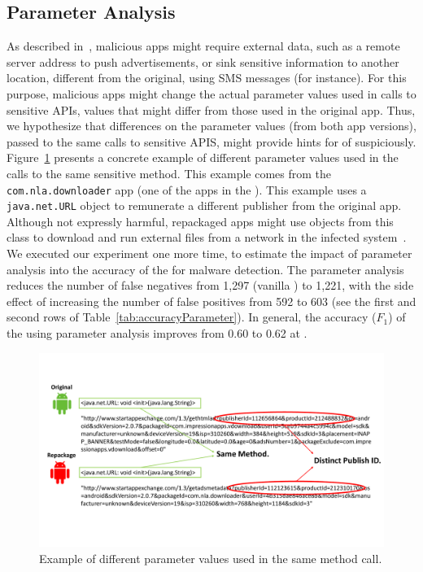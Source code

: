 \subsection{Parameter Analysis}

As described in~\cite{le2018towards}, malicious apps might require external data,
such as a remote server address to push advertisements, or sink sensitive information to another location,
different from the original, using SMS messages (for instance). For this purpose, malicious apps
might change the actual parameter values used in calls to sensitive APIs, values that might differ from those
used in the original app. Thus, we hypothesize that differences on the parameter values (from both app versions), passed to the same calls to
sensitive APIS, might provide hints for of suspiciously. Figure~\ref{fig:parameterDiff} presents a concrete example of
different parameter values used in the calls to the same sensitive method. This example comes from the \texttt{com.nla.downloader} app
(one of the apps in the \cds). This example uses a \texttt{java.net.URL} object to remunerate a different publisher from the original app.
{\color{red}Although not expressly harmful, repackaged apps might use objects from this class to download and run external files
  from a network in the infected system~\cite{DBLP:journals/compsec/ObaidatSPP22}.} We executed our
experiment one more time, to estimate the impact of parameter analysis into the accuracy of the \mas for
malware detection. 
The parameter analysis reduces the number of false negatives from 1,297 (vanilla \mas) to 1,221, with the side effect of
increasing the number of false positives from 592 to 603 (see the first and second rows of Table~\ref{tab:accuracyParameter}).
In general, the accuracy ($F_1$) of the \mas using parameter analysis improves from 0.60 to 0.62 at \cds.

\begin{figure}[t]
\centering
\includegraphics[scale=0.3]{images/parameterDiff.pdf}
\caption{Example of different parameter values used in the same method call.}
 \label{fig:parameterDiff}
\end{figure}

